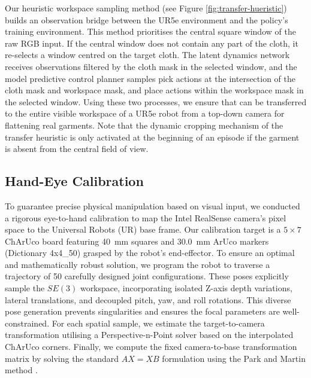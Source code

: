 \documentclass[journal]{IEEEtran}
\begin{document}

Our heuristic workspace sampling method (see Figure \ref{fig:transfer-hueristic}) builds an observation bridge between the UR5e environment and the policy's training environment. This method prioritises the central square window of the raw RGB input. If the central window does not contain any part of the cloth, it re-selects a window centred on the target cloth. The  latent dynamics network receives observations filtered by the cloth mask in the selected window, and the model predictive control planner samples pick actions at the intersection of the cloth mask and workspace mask, and place actions within the workspace mask in the selected window. Using these two processes, we ensure that  can be transferred to the entire visible workspace of a UR5e robot from a top-down camera for flattening real garments. Note that the dynamic cropping mechanism of the transfer heuristic is only activated at the beginning of an episode if the garment is absent from the central field of view.


\subsection{Hand-Eye Calibration} \label{sec:calibration}

To guarantee precise physical manipulation based on visual input, we conducted a rigorous eye-to-hand calibration to map the Intel RealSense camera's pixel space to the Universal Robots (UR) base frame. Our calibration target is a $5 \times 7$ ChArUco board \cite{garrido2014automatic} featuring 40~mm squares and 30.0~mm ArUco markers (Dictionary 4x4\_50) grasped by the robot's end-effector. To ensure an optimal and mathematically robust solution, we program the robot to traverse a trajectory of 50 carefully designed joint configurations. These poses explicitly sample the $SE(3)$ workspace, incorporating isolated Z-axis depth variations, lateral translations, and decoupled pitch, yaw, and roll rotations. This diverse pose generation prevents singularities and ensures the focal parameters are well-constrained. For each spatial sample, we estimate the target-to-camera transformation utilising a Perspective-n-Point solver based on the interpolated ChArUco corners. Finally, we compute the fixed camera-to-base transformation matrix by solving the standard $AX=XB$ formulation using the Park and Martin method \cite{park1994robot}.
\end{document}
